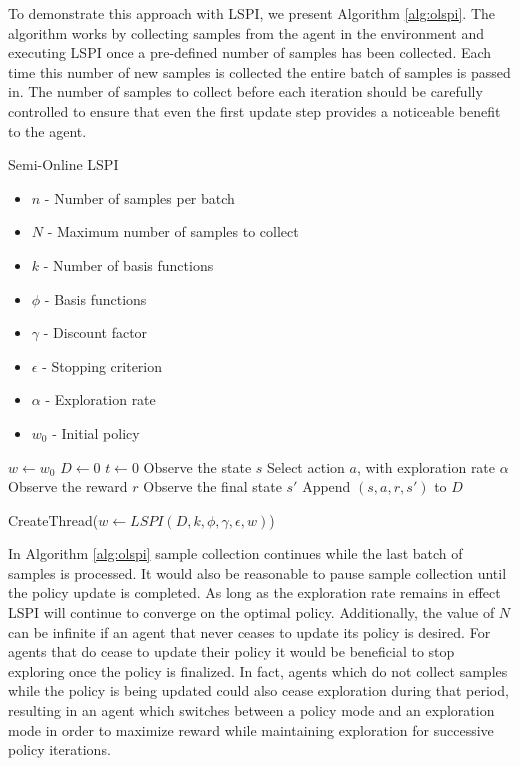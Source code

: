 To demonstrate this approach with LSPI, we present Algorithm \ref{alg:olspi}. The algorithm works by collecting samples from the agent in the environment and executing LSPI once a pre-defined number of samples has been collected. Each time this number of new samples is collected the entire batch of samples is passed in. The number of samples to collect before each iteration should be carefully controlled to ensure that even the first update step provides a noticeable benefit to the agent.

\begin{algorithm}
\caption{Semi-Online LSPI}
\label{alg:olspi}
    {\fontsize{12}{10}\selectfont
    \begin{algorithmic}[1]
        \REQUIRE
            \begin{itemize} 
                \item $n$ - Number of samples per batch
                \item $N$ - Maximum number of samples to collect
                \item $k$ - Number of basis functions
                \item $\phi$ - Basis functions
                \item $\gamma$ - Discount factor
                \item $\epsilon$ - Stopping criterion
                \item $\alpha$ - Exploration rate
                \item $w_0$ - Initial policy
            \end{itemize}
        \STATE $w \leftarrow w_0$ 
        \STATE $D \leftarrow 0$
        \STATE $t \leftarrow 0$
                \STATE Observe the state $s$
                \STATE Select action $a$, with exploration rate $\alpha$
                \STATE Observe the reward $r$
                \STATE Observe the final state $s'$
                \STATE Append $(s,a,r,s')$ to $D$
            \ENDFOR
            
            \STATE CreateThread($w \leftarrow LSPI(D, k, \phi, \gamma, \epsilon, w)$)
        \ENDWHILE
    \end{algorithmic}
    }
\end{algorithm}

In Algorithm \ref{alg:olspi} sample collection continues while the last batch of samples is processed. It would also be reasonable to pause sample collection until the policy update is completed. As long as the exploration rate remains in effect LSPI will continue to converge on the optimal policy. Additionally, the value of $N$ can be infinite if an agent that never ceases to update its policy is desired. For agents that do cease to update their policy it would be beneficial to stop exploring once the policy is finalized. In fact, agents which do not collect samples while the policy is being updated could also cease exploration during that period, resulting in an agent which switches between a policy mode and an exploration mode in order to maximize reward while maintaining exploration for successive policy iterations.

